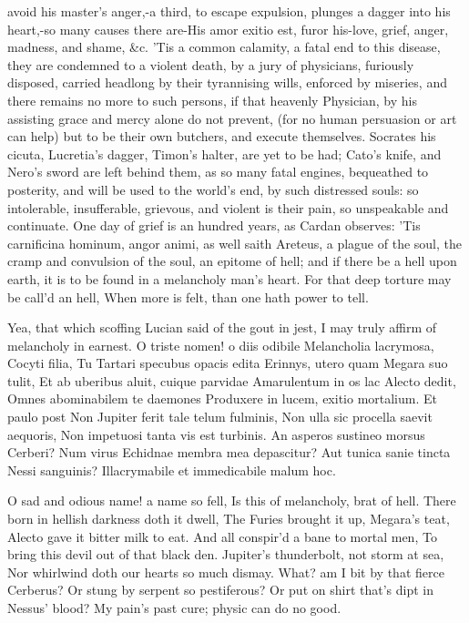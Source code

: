 avoid his master's anger,-a third, to escape expulsion, plunges a
dagger into his heart,-so many causes there are-His amor exitio est,
furor his-love, grief, anger, madness, and shame, \&c. 'Tis a common
calamity, a fatal end to this disease, they are condemned to a
violent death, by a jury of physicians, furiously disposed, carried
headlong by their tyrannising wills, enforced by miseries, and there
remains no more to such persons, if that heavenly Physician, by his
assisting grace and mercy alone do not prevent, (for no human
persuasion or art can help) but to be their own butchers, and execute
themselves. Socrates his cicuta, Lucretia's dagger, Timon's halter, are
yet to be had; Cato's knife, and Nero's sword are left behind them, as
so many fatal engines, bequeathed to posterity, and will be used to the
world's end, by such distressed souls: so intolerable, insufferable,
grievous, and violent is their pain, so unspeakable and
continuate. One day of grief is an hundred years, as Cardan observes:
'Tis carnificina hominum, angor animi, as well saith Areteus, a plague
of the soul, the cramp and convulsion of the soul, an epitome of hell;
and if there be a hell upon earth, it is to be found in a melancholy
man's heart.
For that deep torture may be call'd an hell,
When more is felt, than one hath power to tell.

Yea, that which scoffing Lucian said of the gout in jest, I may truly
affirm of melancholy in earnest.
O triste nomen! o diis odibile
Melancholia lacrymosa, Cocyti filia,
Tu Tartari specubus opacis edita
Erinnys, utero quam Megara suo tulit,
Et ab uberibus aluit, cuique parvidae
Amarulentum in os lac Alecto dedit,
Omnes abominabilem te daemones
Produxere in lucem, exitio mortalium. Et paulo post
Non Jupiter ferit tale telum fulminis,
Non ulla sic procella saevit aequoris,
Non impetuosi tanta vis est turbinis.
An asperos sustineo morsus Cerberi?
Num virus Echidnae membra mea depascitur?
Aut tunica sanie tincta Nessi sanguinis?
Illacrymabile et immedicabile malum hoc.

O sad and odious name! a name so fell,
Is this of melancholy, brat of hell.
There born in hellish darkness doth it dwell,
The Furies brought it up, Megara's teat,
Alecto gave it bitter milk to eat.
And all conspir'd a bane to mortal men,
To bring this devil out of that black den.
Jupiter's thunderbolt, not storm at sea,
Nor whirlwind doth our hearts so much dismay.
What? am I bit by that fierce Cerberus?
Or stung by serpent so pestiferous?
Or put on shirt that's dipt in Nessus' blood?
My pain's past cure; physic can do no good.

